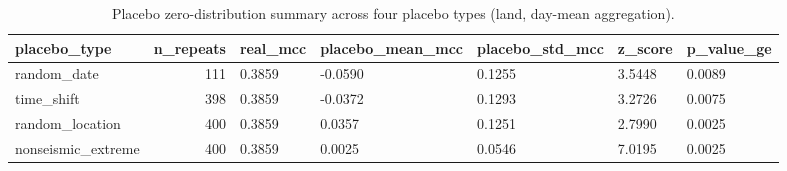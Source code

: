 \begin{table}
\caption{Placebo zero-distribution summary across four placebo types (land, day-mean aggregation).}
\label{tab:tableS6}
\begin{tabular}{lrlllll}
\toprule
placebo\_type & n\_repeats & real\_mcc & placebo\_mean\_mcc & placebo\_std\_mcc & z\_score & p\_value\_ge \\
\midrule
random\_date & 111 & 0.3859 & -0.0590 & 0.1255 & 3.5448 & 0.0089 \\
time\_shift & 398 & 0.3859 & -0.0372 & 0.1293 & 3.2726 & 0.0075 \\
random\_location & 400 & 0.3859 & 0.0357 & 0.1251 & 2.7990 & 0.0025 \\
nonseismic\_extreme & 400 & 0.3859 & 0.0025 & 0.0546 & 7.0195 & 0.0025 \\
\bottomrule
\end{tabular}
\end{table}
